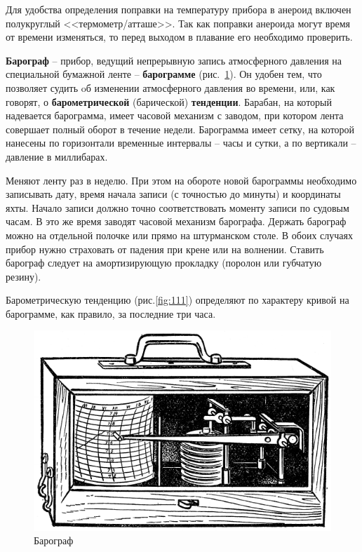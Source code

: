\documentclass[a4paper, 12pt, twoside, final, book, russian, fittopage, cyremdash]{ncc}
\newcommand{\ris}[1]{\ref{fig:#1}}
\begin{document}
Для удобства определения поправки на температуру прибора в анероид включен полукруглый <<термометр\-/атташе>>. Так как поправки анероида могут время от времени изменяться, то перед выходом в плавание его необходимо проверить.

\textbf{Барограф} \--- прибор, ведущий непрерывную запись атмосферного давления на специальной бумажной ленте \--- \textbf{барограмме} (рис.~\ris{110}). Он удобен тем, что позволяет судить oб изменении атмосферного давления во времени, или, как говорят, о \textbf{барометрической} (барической) \textbf{тенденции}. Барабан, на который надевается барограмма, имеет часовой механизм с заводом, при котором лента совершает полный оборот в течение недели. Барограмма имеет сетку, на которой нанесены по горизонтали временные интервалы \--- часы и сутки, а по вертикали \--- давление в миллибарах.

Меняют ленту раз в неделю. При этом на обороте новой барограммы необходимо записывать дату, время начала записи (с точностью до минуты) и координаты яхты. Начало записи должно точно соответствовать моменту записи по судовым часам. В это же время заводят часовой механизм барографа. Держать барограф можно на отдельной полочке или прямо на штурманском столе. В обоих случаях прибор нужно страховать от падения при крене или на волнении. Ставить барограф следует на амортизирующую прокладку (поролон или губчатую резину).

Барометрическую тенденцию (рис.\ris{111}) определяют по характеру кривой на барограмме, как правило, за последние три часа.

\begin{figure}[htb]
  \centering{}
  \includegraphics[scale=1.3]{0110P}
  \caption{Барограф }
  \label{fig:110}
\end{figure}
\end{document}
